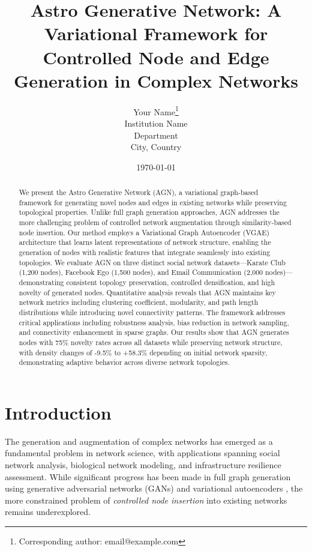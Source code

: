 \documentclass[12pt]{article}
\title{Astro Generative Network: A Variational Framework for Controlled Node and Edge Generation in Complex Networks}
\author{Your Name\thanks{Corresponding author: email@example.com} \\
        Institution Name \\
        Department \\
        City, Country}
\date{\today}
\begin{document}
\maketitle

\begin{abstract}
We present the Astro Generative Network (AGN), a variational graph-based framework for generating novel nodes and edges in existing networks while preserving topological properties. Unlike full graph generation approaches, AGN addresses the more challenging problem of controlled network augmentation through similarity-based node insertion. Our method employs a Variational Graph Autoencoder (VGAE) architecture that learns latent representations of network structure, enabling the generation of nodes with realistic features that integrate seamlessly into existing topologies. We evaluate AGN on three distinct social network datasets---Karate Club (1,200 nodes), Facebook Ego (1,500 nodes), and Email Communication (2,000 nodes)---demonstrating consistent topology preservation, controlled densification, and high novelty of generated nodes. Quantitative analysis reveals that AGN maintains key network metrics including clustering coefficient, modularity, and path length distributions while introducing novel connectivity patterns. The framework addresses critical applications including robustness analysis, bias reduction in network sampling, and connectivity enhancement in sparse graphs. Our results show that AGN generates nodes with 75\% novelty rates across all datasets while preserving network structure, with density changes of -9.5\% to +58.3\% depending on initial network sparsity, demonstrating adaptive behavior across diverse network topologies.
\end{abstract}


\section{Introduction}

The generation and augmentation of complex networks has emerged as a fundamental problem in network science, with applications spanning social network analysis, biological network modeling, and infrastructure resilience assessment. While significant progress has been made in full graph generation using generative adversarial networks (GANs) \cite{goodfellow2014generative} and variational autoencoders \cite{kingma2013auto}, the more constrained problem of \textit{controlled node insertion} into existing networks remains underexplored.
\end{document}
